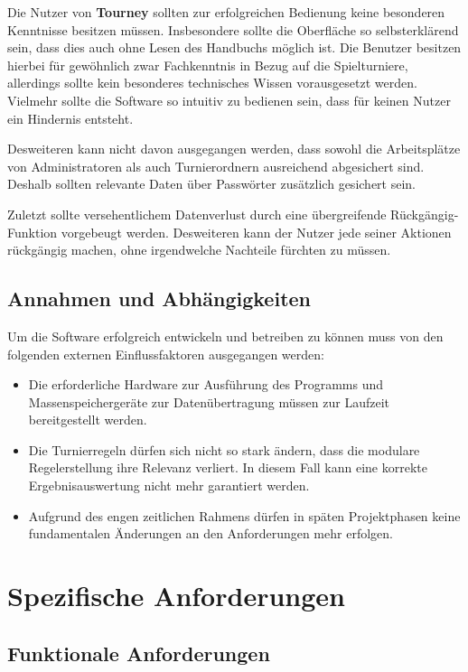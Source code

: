 \documentclass[11pt]{article}
\begin{document}
Die Nutzer von \textbf{Tourney} sollten zur erfolgreichen Bedienung keine besonderen Kenntnisse besitzen müssen. Insbesondere sollte die Oberfläche so selbsterklärend sein, dass dies auch ohne Lesen des Handbuchs möglich ist. Die Benutzer besitzen hierbei für gewöhnlich zwar Fachkenntnis in Bezug auf die Spielturniere, allerdings sollte kein besonderes technisches Wissen vorausgesetzt werden. Vielmehr sollte die Software so intuitiv zu bedienen sein, dass für keinen Nutzer ein Hindernis entsteht.

Desweiteren kann nicht davon ausgegangen werden, dass sowohl die Arbeitsplätze von Administratoren als auch Turnierordnern ausreichend abgesichert sind. Deshalb sollten relevante Daten über Passwörter zusätzlich gesichert sein.

Zuletzt sollte versehentlichem Datenverlust durch eine übergreifende Rückgängig-Funktion vorgebeugt werden. Desweiteren kann der Nutzer jede seiner Aktionen rückgängig machen, ohne irgendwelche Nachteile fürchten zu müssen.

\subsection{Annahmen und Abhängigkeiten}

Um die Software erfolgreich entwickeln und betreiben zu können muss von den folgenden externen Einflussfaktoren ausgegangen werden:
\begin{itemize}
	\item Die erforderliche Hardware zur Ausführung des Programms und Massenspeichergeräte zur Datenübertragung müssen zur Laufzeit bereitgestellt werden.
	\item Die Turnierregeln dürfen sich nicht so stark ändern, dass die modulare Regelerstellung ihre Relevanz verliert. In diesem Fall kann eine korrekte Ergebnisauswertung nicht mehr garantiert werden.
	\item Aufgrund des engen zeitlichen Rahmens dürfen in späten Projektphasen keine fundamentalen Änderungen an den Anforderungen mehr erfolgen.
\end{itemize}

\newpage

\section{Spezifische Anforderungen}

\subsection{Funktionale Anforderungen}
\end{document}
